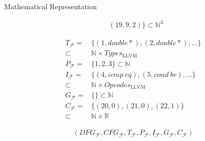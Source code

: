 \begin{blackbox}{Mathematical Representation}
\begin{minipage}{0.329\textwidth}
\begin{graybox}
\begin{align*}
                  &(19,9,2)\}\subset\mathbb N^3
            \end{align*}
        \end{graybox}
    \end{minipage}
    \begin{minipage}{0.329\textwidth}
        \centering
        \begin{graybox}
            \scriptsize
            \setlength{\abovedisplayskip}{0pt}
            \setlength{\belowdisplayskip}{0pt}
            \vspace{-0.5em}
            \begin{align*}
                T_\mathcal F={}&\{(1,double*),(2,double*),\dots\}\\[-0.5em]
                      \subset{}&\mathbb N\times Types_\text{LLVM}\\[-0.25em]
                P_\mathcal F={}&\{1,2,3\}\subset\mathbb N\\[-0.25em]
                I_\mathcal F={}&\{(4,icmp\ eq),(5,cond\ br),\dots\}\\[-0.5em]
                      \subset{}&\mathbb N\times Opcodes_\text{LLVM}\\[-0.25em]
                G_\mathcal F={}&\{\}\subset\mathbb N\\[-0.25em]
                C_\mathcal F={}&\{(20,0),(21,0),(22,1)\}\\[-0.5em]
                      \subset{}&\mathbb N\times\mathbb R
            \end{align*}

            \vspace{0.45em}
        \end{graybox}
    \end{minipage}

    \begin{minipage}{0.5\textwidth}
        \begin{graybox}
            \setlength{\abovedisplayskip}{0pt}
            \setlength{\belowdisplayskip}{0pt}
            \vspace{-0.5em}
            \begin{align*}
                (DFG_\mathcal{F},
                 CFG_\mathcal{F},
                 T_\mathcal{F},
                 P_\mathcal{F},
                 I_\mathcal{F},
                 G_\mathcal{F},
                 C_\mathcal{F})
            \end{align*}
        \end{graybox}
    \end{minipage}
\end{blackbox}